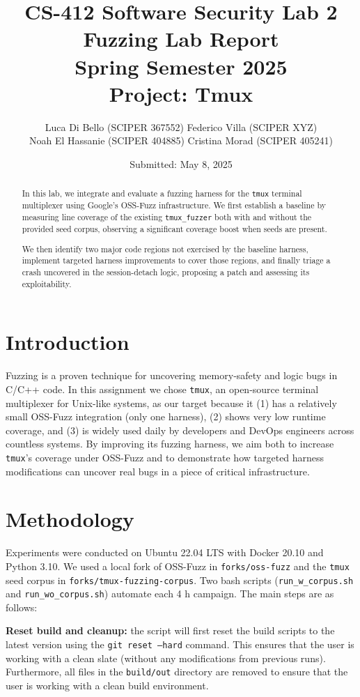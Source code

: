 \documentclass[11pt,a4paper,twocolumn]{article}
\title{%
  CS-412 Software Security Lab 2\\[0.5em]
  \Large Fuzzing Lab Report\\
  Spring Semester 2025\\[0.5em]
  Project: Tmux
}
\author{%
  Luca Di Bello (SCIPER 367552)
  Federico Villa (SCIPER XYZ) \\
  Noah El Hassanie (SCIPER 404885)
  Cristina Morad (SCIPER 405241) \\
}
\date{Submitted: May 8, 2025}
\begin{document}
\maketitle

\begin{abstract}
	In this lab, we integrate and evaluate a fuzzing harness for the \texttt{tmux} terminal
	multiplexer using Google’s OSS-Fuzz infrastructure. We first establish a baseline
	by measuring line coverage of the existing \texttt{tmux\_fuzzer} both with and without the
	provided seed corpus, observing a significant coverage boost when seeds are present.

	We then identify two major code regions not exercised by the baseline harness, implement
	targeted harness improvements to cover those regions, and finally triage a crash uncovered
	in the session-detach logic, proposing a patch and assessing its exploitability.
\end{abstract}

\section{Introduction}

Fuzzing is a proven technique for uncovering memory‐safety and logic bugs in C/C++ code. In this assignment we chose \texttt{tmux}, an open-source terminal multiplexer for Unix-like systems, as our target because it (1) has a relatively small OSS-Fuzz integration (only one harness), (2) shows very low runtime coverage, and (3) is widely used daily by developers and DevOps engineers across countless systems.  By improving its fuzzing harness, we aim both to increase \texttt{tmux}’s coverage under OSS-Fuzz and to demonstrate how targeted harness modifications can uncover real bugs in a piece of critical infrastructure.

\section{Methodology}

Experiments were conducted on Ubuntu 22.04 LTS with Docker 20.10 and Python 3.10. We used a local fork of OSS-Fuzz in \texttt{forks/oss-fuzz} and the \texttt{tmux} seed corpus in \texttt{forks/tmux-fuzzing-corpus}. Two bash scripts (\texttt{run\_w\_corpus.sh} and \texttt{run\_wo\_corpus.sh}) automate each 4 h campaign. The main steps are as follows:

\textbf{Reset build and cleanup:} the script will first reset the build scripts to the latest version using the \texttt{git reset ---hard} command. This ensures that the user is working with a clean slate (without any modifications from previous runs). Furthermore, all files in the \texttt{build/out} directory are removed to ensure that the user is working with a clean build environment.
\end{document}
